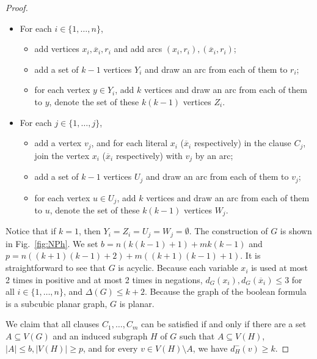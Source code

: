 \documentclass[11pt,a4paper]{article}
\begin{document}
\begin{proof}
\begin{itemize}
\item For each $i\in\{1,\ldots,n\}$,
\begin{itemize}
\item add vertices $x_i,\overline{x}_i,r_i$ and add arcs $(x_i,r_i),(\overline{x}_i,r_i)$;
\item add a set of $k-1$ vertices $Y_i$ and draw an arc from each of them to $r_i$;
\item for each vertex $y\in Y_i$, add $k$ vertices and draw an arc from each of them to $y$, denote the set of these
    $k(k-1)$ vertices $Z_i$.
\end{itemize}
\item For each $j\in\{1,\ldots,j\}$,
\begin{itemize}
\item add a vertex $v_j$, and for each literal $x_i$ ($\overline{x}_i$ respectively) in the clause $C_j$, join the
    vertex $x_i$ ($\overline{x}_i$ respectively) with $v_j$ by an arc;
\item add a set of $k-1$ vertices $U_j$ and draw an arc from each of them to $v_j$;
\item for each vertex $u\in U_j$, add $k$ vertices and draw an arc from each of them to $u$, denote the set of these
    $k(k-1)$ vertices $W_j$.
\end{itemize}
\end{itemize}
Notice that if $k=1$, then $Y_i=Z_i=U_j=W_j=\emptyset$. The construction of $G$ is shown in Fig.~\ref{fig:NPh}. We set
$b=n(k(k-1)+1)+mk(k-1)$ and $p=n((k+1)(k-1)+2)+m((k+1)(k-1)+1)$. It is straightforward to see that $G$ is acyclic. Because
each variable $x_i$ is used at most 2 times in positive and at most 2 times in negations, $d_G(x_i), d_G(\overline{x}_i)\leq
3$ for all $i\in\{1,\ldots,n\}$, and $\Delta(G)\leq k+2$. 
Because the graph of the boolean formula is a subcubic planar graph,  
$G$ is planar.

We claim that all clauses $C_1,\ldots,C_m$ can be satisfied if and only if there are a set $A\subseteq V(G)$
and an induced subgraph $H$ of $G$ such
that $A\subseteq V(H)$, $|A|\leq b, |V(H)|\geq p$, and for every $v\in V(H)\setminus A$, we have $d^{-}_{H}(v)\geq k$.


\end{proof}
\end{document}
